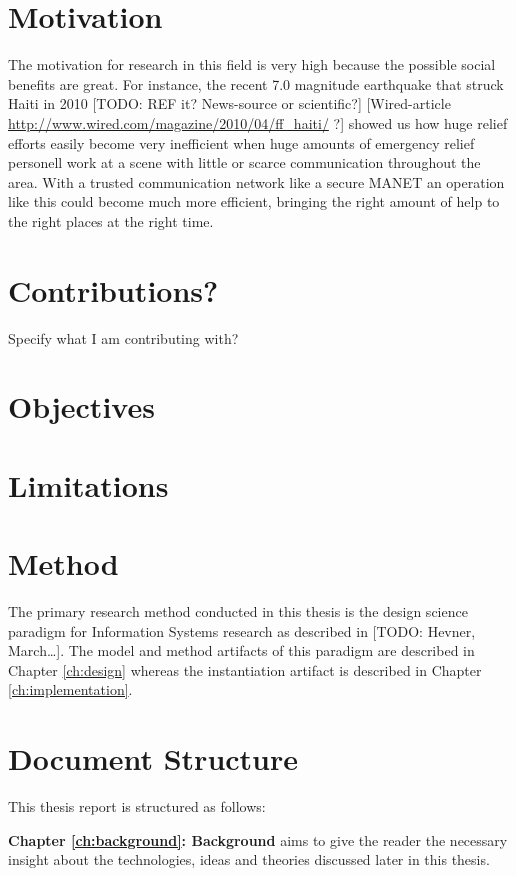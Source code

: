 \section{Motivation}
The motivation for research in this field is very high because the possible
social benefits are great. For instance, the recent 7.0 magnitude earthquake
that struck Haiti in 2010 [TODO: REF it? News-source or scientific?]
[Wired-article \url{http://www.wired.com/magazine/2010/04/ff_haiti/} ?] showed
us how huge relief efforts easily become very inefficient when huge amounts of
emergency relief personell work at a scene with little or scarce communication
throughout the area. With a trusted communication network like a secure
\ac{MANET} an operation like this could become much more efficient, bringing the
right amount of help to the right places at the right time.

\section{Contributions?}
Specify what I am contributing with?

\section{Objectives}

\section{Limitations}

\section{Method}
The primary research method conducted in this thesis is the design science
paradigm for Information Systems research as described in [TODO: Hevner,
March\ldots]. The model and method artifacts of this paradigm are described in
Chapter \ref{ch:design} whereas the instantiation artifact is described in
Chapter \ref{ch:implementation}.

\section{Document Structure}
This thesis report is structured as follows:

\textbf{Chapter \ref{ch:background}: Background} aims to give the reader the
necessary insight about the technologies, ideas and theories discussed later in
this thesis.

